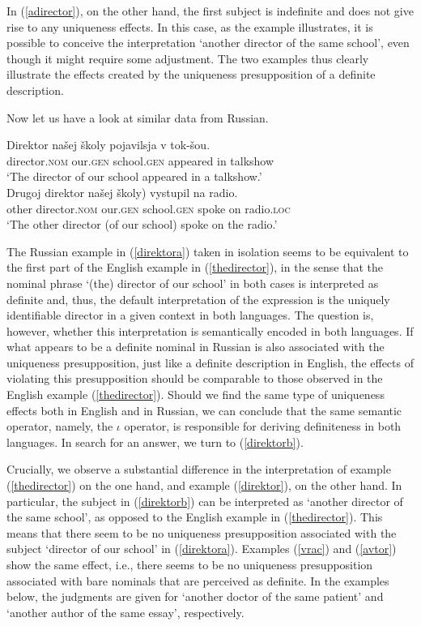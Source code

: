\documentclass[output=paper,colorlinks,citecolor=brown]{langscibook}
\begin{document}
In (\ref{adirector}), on the other hand, the first subject is indefinite and does not give rise to any uniqueness effects. In this case, as the example illustrates, it is possible to conceive the interpretation `another director of the same school', even though it might require some adjustment. The two examples thus clearly illustrate the effects created by the uniqueness presupposition of a definite description.

Now let us have a look at similar data from Russian. 

\ea \label{direktor}
\ea \gll 
Direktor		na\v{s}ej	\v{s}koly			pojavilsja	v	tok-\v{s}ou. \label{direktora}\\
director.\textsc{nom}	our.\textsc{gen}	school.\textsc{gen} 	appeared	in 	talkshow \\
\glt `The director of our school appeared in a talkshow.' \\
\ex \gll
Drugoj	direktor \minsp{(} na\v{s}ej	\v{s}koly)		vystupil	na	radio. \label{direktorb} \\
other director.\textsc{nom} {} our.\textsc{gen}	school.\textsc{gen} spoke	on radio.\textsc{loc}\\
\glt `The other director (of our school) spoke on the radio.'
\z
\z

\noindent The Russian example in (\ref{direktora}) taken in isolation seems to be equivalent to the first part of the English example in (\ref{thedirector}), in the sense that the nominal phrase `(the) director of our school' in both cases is interpreted as definite and, thus, the default interpretation of the expression is the uniquely identifiable director in a given context in both languages. The question is, however, whether this interpretation is semantically encoded in both languages. If what appears to be a definite nominal in Russian is also associated with the uniqueness presupposition, just like a definite description in English, the effects of violating this presupposition should be comparable to those observed in the English example (\ref{thedirector}). Should we find the same type of uniqueness effects both in English and in Russian, we can conclude that the same semantic operator, namely, the $\iota$ operator, is responsible for deriving definiteness in both languages. In search for an answer, we turn to (\ref{direktorb}).

Crucially, we observe a substantial difference in the interpretation of example (\ref{thedirector}) on the one hand, and example (\ref{direktor}), on the other hand. In particular, the subject in (\ref{direktorb}) can be interpreted as `another director of the same school', as opposed to the English example in (\ref{thedirector}). This means that there seem to be no uniqueness presupposition associated with the subject `director of our school' in (\ref{direktora}). Examples (\ref{vrac}) and (\ref{avtor}) show the same effect, i.e., there seems to be no uniqueness presupposition associated with bare nominals that are perceived as definite. In the examples below, the judgments are given for `another doctor of the same patient' and `another author of the same essay', respectively.
\end{document}
